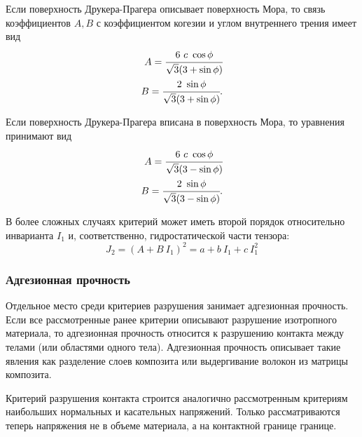 Если поверхность Друкера-Прагера описывает поверхность Мора, то связь коэффициентов $A, B$ с коэффициентом когезии и углом внутреннего трения имеет вид
\begin{eqnarray}
A = \cfrac{6~c~\cos\phi}{\sqrt{3}(3+\sin\phi)} \\
B = \cfrac{2~\sin\phi}{\sqrt{3}(3+\sin\phi)}.
\end{eqnarray}

Если поверхность Друкера-Прагера вписана в поверхность Мора, то уравнения принимают вид
\begin{eqnarray}
A = \cfrac{6~c~\cos\phi}{\sqrt{3}(3-\sin\phi)} \\
B = \cfrac{2~\sin\phi}{\sqrt{3}(3-\sin\phi)}.
\end{eqnarray}

В более сложных случаях критерий может иметь второй порядок относительно инварианта $I_1$ и, соответственно, гидростатической части тензора:
\begin{equation}
J_2 = (A + B~I_1)^2 = a + b~I_1 + c~I_1^2
\end{equation}

\subsubsection{Адгезионная прочность}

Отдельное место среди критериев разрушения занимает адгезионная прочность. Если все рассмотренные ранее критерии описывают разрушение изотропного материала, то адгезионная прочность относится к разрушению контакта между телами (или областями одного тела). Адгезионная прочность описывает такие явления как разделение слоев композита или выдергивание волокон из матрицы композита.

Критерий разрушения контакта строится аналогично рассмотренным критериям наибольших нормальных и касательных напряжений. Только рассматриваются теперь напряжения не в объеме материала, а на контактной границе границе.


